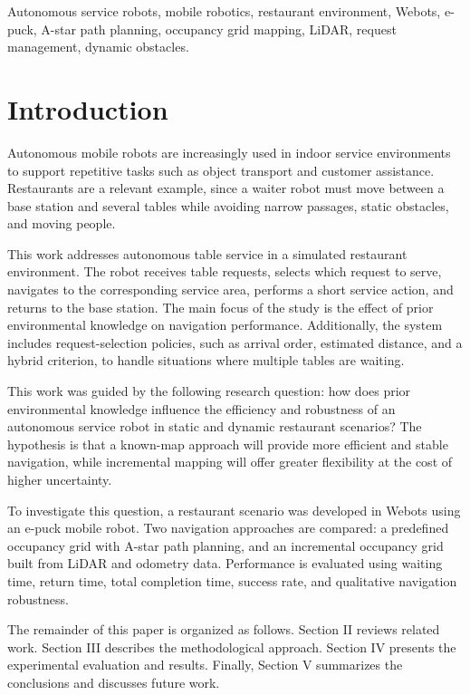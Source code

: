 \documentclass[conference]{IEEEtran}
\begin{document}
\begin{IEEEkeywords}
Autonomous service robots, mobile robotics, restaurant environment, Webots, e-puck, A-star path planning, occupancy grid mapping, LiDAR, request management, dynamic obstacles.
\end{IEEEkeywords}



\section{Introduction}

Autonomous mobile robots are increasingly used in indoor service environments to support repetitive tasks such as object transport and customer assistance. Restaurants are a relevant example, since a waiter robot must move between a base station and several tables while avoiding narrow passages, static obstacles, and moving people.

This work addresses autonomous table service in a simulated restaurant environment. The robot receives table requests, selects which request to serve, navigates to the corresponding service area, performs a short service action, and returns to the base station. The main focus of the study is the effect of prior environmental knowledge on navigation performance. Additionally, the system includes request-selection policies, such as arrival order, estimated distance, and a hybrid criterion, to handle situations where multiple tables are waiting.

This work was guided by the following research question: how does prior environmental knowledge influence the efficiency and robustness of an autonomous service robot in static and dynamic restaurant scenarios? The hypothesis is that a known-map approach will provide more efficient and stable navigation, while incremental mapping will offer greater flexibility at the cost of higher uncertainty.

To investigate this question, a restaurant scenario was developed in Webots using an e-puck mobile robot. Two navigation approaches are compared: a predefined occupancy grid with A-star path planning, and an incremental occupancy grid built from LiDAR and odometry data. Performance is evaluated using waiting time, return time, total completion time, success rate, and qualitative navigation robustness.

The remainder of this paper is organized as follows. Section II reviews related work. Section III describes the methodological approach. Section IV presents the experimental evaluation and results. Finally, Section V summarizes the conclusions and discusses future work.
\end{document}
